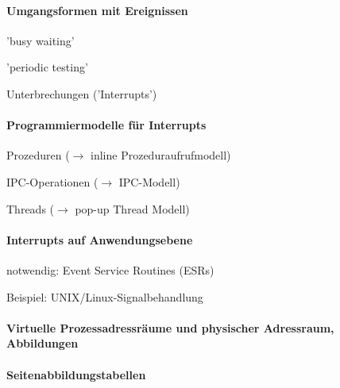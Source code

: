 \documentclass[a4paper]{article}
\begin{document}
\begin{multicols}{3}
  \paragraph{Umgangsformen mit Ereignissen}
  \begin{itemize*}
    \item 'busy waiting'
    \item 'periodic testing'
    \item Unterbrechungen ('Interrupts')
  \end{itemize*}

  \paragraph{Programmiermodelle für Interrupts}
  \begin{itemize*}
    \item Prozeduren ($\rightarrow$ inline Prozeduraufrufmodell)
    \item IPC-Operationen ($\rightarrow$ IPC-Modell)
    \item Threads ($\rightarrow$ pop-up Thread Modell)
  \end{itemize*}

  \paragraph{Interrupts auf Anwendungsebene}
  \begin{itemize*}
    \item notwendig: Event Service Routines (ESRs)
    \item Beispiel: UNIX/Linux-Signalbehandlung
  \end{itemize*}

  \paragraph{Virtuelle Prozessadressräume und physischer Adressraum, Abbildungen}

  \paragraph{Seitenabbildungstabellen}


\end{multicols}
\end{document}
